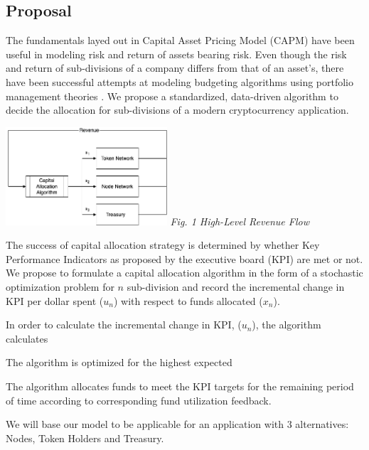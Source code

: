 \documentclass[conference,letterpaper]{IEEEtran}
\begin{document}
        \subsection{Proposal}
            The fundamentals layed out in Capital Asset Pricing Model (CAPM)
            \cite{portfolioSelection} have been useful in modeling risk and return of
            assets bearing risk. Even though the risk and return of sub-divisions of a
            company differs from that of an asset's, there have been successful attempts
            at modeling budgeting algorithms using portfolio management theories
            \cite{cetingoz}. We propose a standardized, data-driven algorithm to decide
            the allocation for sub-divisions of a modern cryptocurrency application.
            \begin{center}
                \includegraphics[width=0.45\textwidth]{assets/high_level_capital_allocation.png}
                \textit{Fig. 1 High-Level Revenue Flow}
            \end{center}
            The success of capital allocation strategy is determined by whether Key
            Performance Indicators as proposed by the executive board (KPI) are met or
            not. We propose to formulate a capital allocation algorithm in the form of a
            stochastic optimization problem for $n$ sub-division and record the
            incremental change in KPI per dollar spent ($u_n$) with respect to funds
            allocated ($x_n$). 
            
            
            In order to calculate the incremental change in KPI, ($u_n$), the algorithm
            calculates 
            
            
            The algorithm is optimized for the highest expected 

            The algorithm allocates funds to meet the KPI targets for the remaining period
            of time according to corresponding fund utilization feedback.

            We will base our model to be applicable for an application with 3
            alternatives: Nodes, Token Holders and Treasury. 
            
\end{document}
